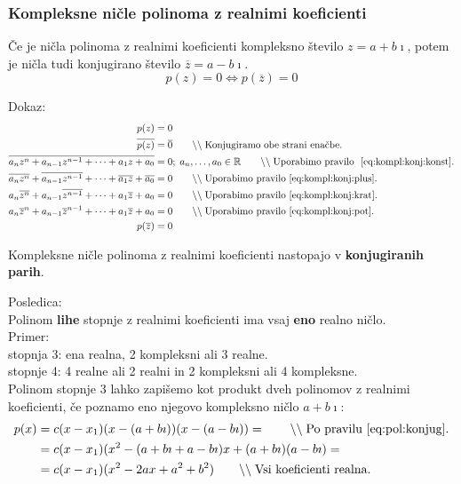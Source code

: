 \documentclass[a4paper,oneside,12pt,fleqn]{article}
\def\R{\ensuremath{\mathbb R}}
\newcommand{\comment}[1]{\ensuremath{\qquad\backslash\backslash\;}\textnormal{#1}}
\newcommand{\ii}{\ensuremath{\imath}}
\def\konj{\overline} %
\renewcommand\iff\Leftrightarrow
\numberwithin{equation}{section}
\begin{document}
\subsubsection{Kompleksne ničle polinoma z realnimi koeficienti}
\label{sec:pol:nic:kompl}
Če je ničla polinoma z realnimi koeficienti kompleksno število $z=a+b\ii$, potem je ničla
tudi konjugirano število $\konj{z} = a-b\ii$.
\begin{equation}
  p(z) = 0 \iff p(\konj{z}) = 0 \label{eq:pol:konjug}
\end{equation}

Dokaz:
\begin{align*}
  p(z) &= 0 \\
  \konj{p(z)} &= \konj{0} \comment{Konjugiramo obe strani enačbe.} \\
  \konj{a_nz^n+a_{n-1}z^{n-1}+\cdots+a_1z+a_0} &= 0; \; a_n,\ldots,a_0 \in \R \comment{Uporabimo pravilo~
  \eqref{eq:kompl:konj:konst}.} \\
  \konj{a_nz^n}+\konj{a_{n-1}z^{n-1}}+\cdots+\konj{a_1z}+\konj{a_0} &= 0
  \comment{Uporabimo pravilo~\eqref{eq:kompl:konj:plus}.} \\
  a_n\konj{z^n}+a_{n-1}\konj{z^{n-1}}+\cdots+a_1\konj{z}+a_0 &= 0 \comment{Uporabimo
  pravilo~\eqref{eq:kompl:konj:krat}.} \\
  a_n\konj{z}^n+a_{n-1}\konj{z}^{n-1}+\cdots+a_1\konj{z}+a_0 &= 0 \comment{Uporabimo
  pravilo~\eqref{eq:kompl:konj:pot}.}\\
  p(\konj{z}) &= 0
\end{align*}

Kompleksne ničle polinoma z realnimi koeficienti nastopajo v \textbf{konjugiranih parih}.

Posledica: \\
Polinom \textbf{lihe} stopnje z realnimi koeficienti ima vsaj \textbf{eno} realno ničlo. \\
Primer: \\
stopnja 3: ena realna, 2 kompleksni ali 3 realne. \\
stopnje 4: 4 realne ali 2 realni in 2 kompleksni ali 4 kompleksne. \\

Polinom stopnje 3 lahko zapišemo kot produkt dveh polinomov z realnimi koeficienti, če
poznamo eno njegovo kompleksno ničlo $a+b\ii$:
\begin{align*}
  p(x) &= c(x-x_1)(x-(a+b\ii))(x-(a-b\ii)) = \comment{Po pravilu \eqref{eq:pol:konjug}.} \\
  &= c(x-x_1)(x^2 -(a+b\ii+a-b\ii)x + (a+b\ii)(a-b\ii) = \\
  &= c(x-x_1)(x^2 -2ax + a^2+b^2) \comment{Vsi koeficienti realna.}
\end{align*}
\end{document}
